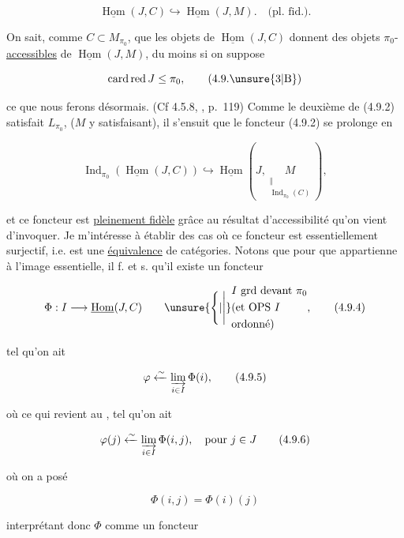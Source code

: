 \[
\underline{\operatorname{Hom}}(J,C)\hookrightarrow\underline{\operatorname{Hom}}(J,M).\quad\text{(pl. fid.)}.\tag*{(4.9.2)}
\]

On sait,  comme $C\subset M_{\pi_0}$, que les objets de $\underline{\operatorname{Hom}}(J,C)$ donnent des objets $\pi_0$-\uline{accessibles} de  $\underline{\operatorname{Hom}}(J,M)$, du moins si on suppose

\[
\operatorname{card}\operatorname{red}J\leq\pi_0,\tag*{(4.9.\unsure{3|B})}
\]

ce que nous ferons désormais. (Cf 4.5.8, , p.~119) Comme le deuxième  de (4.9.2) satisfait $L_{\pi_0}$, ($M$ y satisfaisant), il s'ensuit que  le foncteur (4.9.2) se prolonge en

\[
\operatorname{Ind}_{\pi_0}(\underline{\operatorname{Hom}}(J,C))\hookrightarrow\underline{\operatorname{Hom}}(J,\underset{\substack{\Vert\\ \operatorname{Ind}_{\pi_0}(C)}}{M}),\tag*{(4.9.3)}
\]

et ce foncteur est \uline{pleinement fidèle} grâce au résultat d'accessibilité qu'on vient d'invoquer. Je m'intéresse à établir des cas où ce foncteur est essentiellement surjectif, i.e. est une \uline{équivalence} de catégories. Notons que pour que  appartienne à l'image essentielle, il f. et s. qu'il existe un foncteur

\[
\Phi:I\longrightarrow\underline{\operatorname{Hom}}(J,C)\qquad\unsure{\Biggl\lbrace|\Biggl\vert}\begin{aligned}&I\ \text{grd devant }\pi_0\\ &\text{(et OPS }I\ \\&\text{ordonné)}\end{aligned},\tag*{(4.9.4)}
\]

tel qu'on ait

\[
\varphi\xleftarrow{\sim}\varinjlim_{i\in I}\Phi(i),\tag*{(4.9.5)}
\]

où ce qui revient au , tel qu'on ait

\[
\varphi(j)\xleftarrow{\sim}\varinjlim_{i\in I}\Phi(i,j),\quad\text{pour }j\in J\tag*{(4.9.6)}
\]

où on a posé

\[
\Phi(i,j)=\Phi(i)(j)
\]

interprétant donc $\Phi$ comme un foncteur

